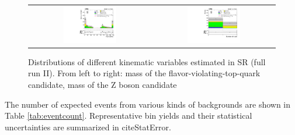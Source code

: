 \begin{figure}[tbh!]
 \begin{center}
 \begin{tabular}{cc}
  \includegraphics[width=0.45\textwidth]{figures/Part3/Nonprompt/SR/Zmass}&
 \includegraphics[width=0.45\textwidth]{figures/Part3/Nonprompt/SR/nbjet} \\
 \end{tabular}
 \caption{Distributions of different kinematic variables estimated in SR (full run II). From left to right: mass of the flavor-violating-top-quark candidate, mass of the Z boson candidate}
 \label{fig:SR_DataDriven_3}
 \end{center}
\end{figure}

The number of expected events from various kinds of backgrounds are shown in Table \ref{tab:eventcount}. Representative bin yields and their statistical uncertainties  are summarized in cite{StatError}. 

